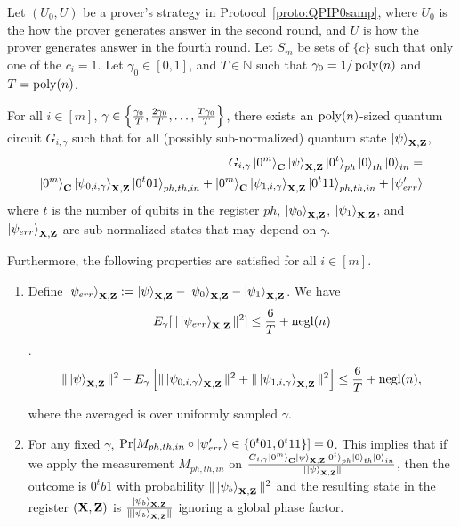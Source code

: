 \begin{lemma}\label{lem:partition}
Let $(U_0,U)$ be a prover's strategy in Protocol~\ref{proto:QPIP0samp}, where $U_0$ is the how the prover generates answer in the second round, and $U$ is how the prover generates answer in the fourth round. Let $S_m$ be sets of $\{c\}$ such that only one of the $c_i=1$. Let $\gamma_0 \in[0,1]$, and $T\in \mathbb{N}$ such that $\gamma_0=1/\operatorname*{\operatorname{poly}}(n)$ and $T=\operatorname*{\operatorname{poly}}(n)$.

 For all $i\in[m]$, $\gamma \in \left\{\frac{\gamma_0}{T},\frac{2\gamma_0}{T},\dots,\frac{T\gamma_0}{T}\right\}$, there exists an $\operatorname*{\operatorname{poly}}(n)$-sized quantum circuit $G_{i,\gamma}$ such that for all (possibly sub-normalized)  quantum state $\ket{\psi}_{\mathbf{X},\mathbf{Z}}$,  
\begin{align*}
    G_{i,\gamma} \ket{0^m}_{\mathbf{C}}\ket{\psi}_{\mathbf{X},\mathbf{Z}}\ket{0^t}_{ph}\ket{0}_{th}\ket{0}_{in} = \\ \ket{0^m}_{\mathbf{C}}\ket{\psi_{0,i,\gamma}}_{\mathbf{X},\mathbf{Z}}\ket{0^t01}_{ph,th,in}+  \ket{0^m}_{\mathbf{C}}\ket{\psi_{1,i,\gamma}}_{\mathbf{X},\mathbf{Z}}\ket{0^t11}_{ph,th,in} + \ket{\psi'_{err}}
\end{align*}
 where $t$ is the number of qubits in the register $ph$, $\ket{\psi_0}_{\mathbf{X},\mathbf{Z}}$, $\ket{\psi_1}_{\mathbf{X},\mathbf{Z}}$, and $\ket{\psi_{err}}_{\mathbf{X},\mathbf{Z}}$ are sub-normalized states that may depend on $\gamma$.

Furthermore, the following properties are satisfied for all $i\in[m]$.
%
\begin{enumerate}
    \item \label{partition-property-1}  Define $\ket{\psi_{err}}_{\mathbf{X},\mathbf{Z}}:= \ket{\psi}_{\mathbf{X},\mathbf{Z}} - \ket{\psi_{0}}_{\mathbf{X},\mathbf{Z}}- \ket{\psi_{1}}_{\mathbf{X},\mathbf{Z}}$. We have  $$E_{\gamma}[\|\ket{\psi_{err}}_{\mathbf{X},\mathbf{Z}}\|^2]\leq \frac{6}{T}+\operatorname{negl}(n)$$. 
    $$\|\ket{\psi}_{\mathbf{X},\mathbf{Z}}\|^2 -E_{\gamma}\left[\|\ket{\psi_{0,i,\gamma}}_{\mathbf{X},\mathbf{Z}}\|^2 +\|\ket{\psi_{1,i,\gamma}}_{\mathbf{X},\mathbf{Z}}\|^2\right]\leq \frac{6}{T}+\operatorname{negl}(n),$$
    
    where the averaged is over uniformly sampled $\gamma$.
\item For any fixed $\gamma$, $\Pr[M_{ph,th,in}\circ \ket{\psi'_{err}} \in \{0^t01,0^t11\}] =0$. %
This implies that if we apply the measurement $M_{ph,th,in}$ on $\frac{G_{i,\gamma} \ket{0^m}_{\mathbf{C}}\ket{\psi}_{\mathbf{X},\mathbf{Z}}\ket{0^t}_{ph}\ket{0}_{th}\ket{0}_{in}}{\|\ket{\psi}_{\mathbf{X},\mathbf{Z}}\|}$, then the outcome is $0^tb1$ with probability $\|\ket{\psi_b}_{\mathbf{X},\mathbf{Z}}\|^2$ and the resulting state in the register $(\mathbf{X},\mathbf{Z})$  is $\frac{\ket{\psi_b}_{\mathbf{X},\mathbf{Z}}}{\|\ket{\psi_b}_{\mathbf{X},\mathbf{Z}}\|}$ ignoring a global phase factor.


\end{enumerate}
\end{lemma}
